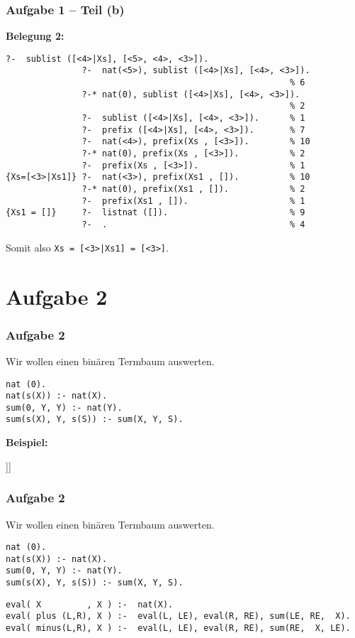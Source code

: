 \documentclass{beamer}
\begin{document}
\begin{frame}[fragile] \frametitle{Aufgabe 1 -- Teil (b)}
	\textbf{Belegung 2:}
	
	\begin{lstlisting}[style=refutation, basicstyle=\ttfamily\scriptsize]
               ?-  sublist ([<4>|Xs], [<5>, <4>, <3>]).
               ?-  nat(<5>), sublist ([<4>|Xs], [<4>, <3>]). 
                                                        % 6
               ?-* nat(0), sublist ([<4>|Xs], [<4>, <3>]).  
                                                        % 2
               ?-  sublist ([<4>|Xs], [<4>, <3>]).      % 1
               ?-  prefix ([<4>|Xs], [<4>, <3>]).       % 7
               ?-  nat(<4>), prefix(Xs , [<3>]).        % 10
               ?-* nat(0), prefix(Xs , [<3>]).          % 2
               ?-  prefix(Xs , [<3>]).                  % 1
{Xs=[<3>|Xs1]} ?-  nat(<3>), prefix(Xs1 , []).          % 10
               ?-* nat(0), prefix(Xs1 , []).            % 2
               ?-  prefix(Xs1 , []).                    % 1
{Xs1 = []}     ?-  listnat ([]).                        % 9
               ?-  .                                    % 4
	\end{lstlisting}
	
	Somit also \texttt{Xs = [<3>|Xs1] = [<3>]}.
\end{frame}




\section{Aufgabe 2}

\begin{frame}[fragile] \frametitle{Aufgabe 2}
	Wir wollen einen binären Termbaum auswerten. 
	\begin{lstlisting}
nat (0).
nat(s(X)) :- nat(X).
sum(0, Y, Y) :- nat(Y).
sum(s(X), Y, s(S)) :- sum(X, Y, S).
	\end{lstlisting}
	
	\textbf{Beispiel:} 
	
	\begin{forest}
		[\texttt{minus} [\texttt{<4>}] [\texttt{plus} [\texttt{<2>}] [\texttt{<1>}]]]
	\end{forest}
\end{frame}

\begin{frame}[fragile] \frametitle{Aufgabe 2}
	Wir wollen einen binären Termbaum auswerten. 
	\begin{lstlisting}
nat (0).
nat(s(X)) :- nat(X).
sum(0, Y, Y) :- nat(Y).
sum(s(X), Y, s(S)) :- sum(X, Y, S).
	\end{lstlisting}
	
	\begin{lstlisting}[firstnumber=5, basicstyle=\ttfamily\tiny]
eval( X         , X ) :-  nat(X). 
eval( plus (L,R), X ) :-  eval(L, LE), eval(R, RE), sum(LE, RE,  X). 
eval( minus(L,R), X ) :-  eval(L, LE), eval(R, RE), sum(RE,  X, LE).
	\end{lstlisting}
\end{frame}
\end{document}
